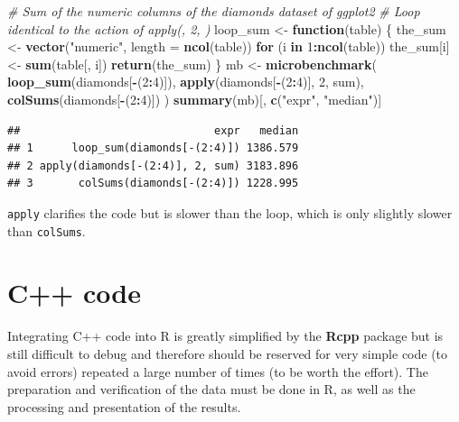 \documentclass[
  12pt,
  american,
  a4paper,
  extrafontsizes,onecolumn,openright
  ]{memoir}
\newenvironment{Shaded}{\begin{snugshade}}{\end{snugshade}}
\newcommand{\AttributeTok}[1]{\textcolor[rgb]{0.13,0.29,0.53}{#1}}
\newcommand{\CommentTok}[1]{\textcolor[rgb]{0.56,0.35,0.01}{\textit{#1}}}
\newcommand{\ControlFlowTok}[1]{\textcolor[rgb]{0.13,0.29,0.53}{\textbf{#1}}}
\newcommand{\DecValTok}[1]{\textcolor[rgb]{0.00,0.00,0.81}{#1}}
\newcommand{\FunctionTok}[1]{\textcolor[rgb]{0.13,0.29,0.53}{\textbf{#1}}}
\newcommand{\NormalTok}[1]{#1}
\newcommand{\OtherTok}[1]{\textcolor[rgb]{0.56,0.35,0.01}{#1}}
\newcommand{\SpecialCharTok}[1]{\textcolor[rgb]{0.81,0.36,0.00}{\textbf{#1}}}
\newcommand{\StringTok}[1]{\textcolor[rgb]{0.31,0.60,0.02}{#1}}
\begin{document}
\begin{Shaded}
\begin{Highlighting}[]
\CommentTok{\# Sum of the numeric columns of the diamonds dataset of ggplot2}
\CommentTok{\# Loop identical to the action of apply(, 2, )}
\NormalTok{loop\_sum }\OtherTok{\textless{}{-}} \ControlFlowTok{function}\NormalTok{(table) \{}
\NormalTok{  the\_sum }\OtherTok{\textless{}{-}} \FunctionTok{vector}\NormalTok{(}\StringTok{"numeric"}\NormalTok{, }\AttributeTok{length =} \FunctionTok{ncol}\NormalTok{(table))}
  \ControlFlowTok{for}\NormalTok{ (i }\ControlFlowTok{in} \DecValTok{1}\SpecialCharTok{:}\FunctionTok{ncol}\NormalTok{(table)) the\_sum[i] }\OtherTok{\textless{}{-}} \FunctionTok{sum}\NormalTok{(table[, i])}
  \FunctionTok{return}\NormalTok{(the\_sum)}
\NormalTok{\}}
\NormalTok{mb }\OtherTok{\textless{}{-}} \FunctionTok{microbenchmark}\NormalTok{(}
  \FunctionTok{loop\_sum}\NormalTok{(diamonds[}\SpecialCharTok{{-}}\NormalTok{(}\DecValTok{2}\SpecialCharTok{:}\DecValTok{4}\NormalTok{)]),}
  \FunctionTok{apply}\NormalTok{(diamonds[}\SpecialCharTok{{-}}\NormalTok{(}\DecValTok{2}\SpecialCharTok{:}\DecValTok{4}\NormalTok{)], }\DecValTok{2}\NormalTok{, sum), }
  \FunctionTok{colSums}\NormalTok{(diamonds[}\SpecialCharTok{{-}}\NormalTok{(}\DecValTok{2}\SpecialCharTok{:}\DecValTok{4}\NormalTok{)])}
\NormalTok{)}
\FunctionTok{summary}\NormalTok{(mb)[, }\FunctionTok{c}\NormalTok{(}\StringTok{"expr"}\NormalTok{, }\StringTok{"median"}\NormalTok{)]}
\end{Highlighting}
\end{Shaded}

\begin{verbatim}
##                              expr   median
## 1      loop_sum(diamonds[-(2:4)]) 1386.579
## 2 apply(diamonds[-(2:4)], 2, sum) 3183.896
## 3       colSums(diamonds[-(2:4)]) 1228.995
\end{verbatim}

\normalsize

\texttt{apply} clarifies the code but is slower than the loop, which is only slightly slower than \texttt{colSums}.

\section{C++ code}\label{sec:cpp}

Integrating C++ code into R is greatly simplified by the \textbf{Rcpp} package but is still difficult to debug and therefore should be reserved for very simple code (to avoid errors) repeated a large number of times (to be worth the effort).
The preparation and verification of the data must be done in R, as well as the processing and presentation of the results.
\end{document}
